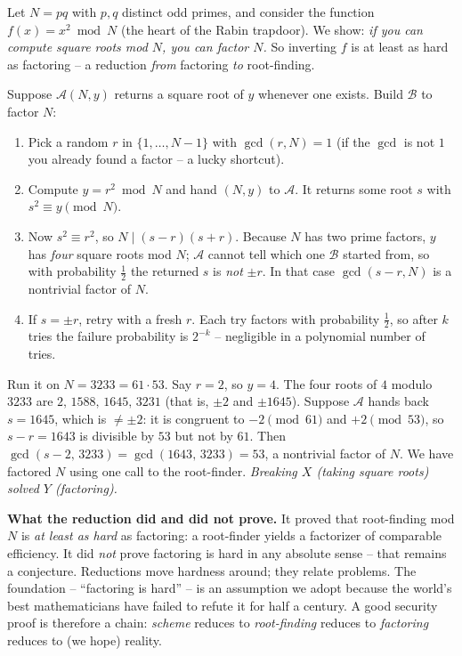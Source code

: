 \begin{example}
\label{ch08:ex-rabin}
Let $N=pq$ with $p,q$ distinct odd primes, and consider the function $f(x)=x^{2}\bmod N$ (the heart of the Rabin trapdoor). We show: \emph{if you can compute square roots mod $N$, you can factor $N$.} So inverting $f$ is at least as hard as factoring -- a reduction \emph{from} factoring \emph{to} root-finding.

Suppose $\mathcal A(N,y)$ returns a square root of $y$ whenever one exists. Build $\mathcal B$ to factor $N$:
\begin{enumerate}
\item Pick a random $r$ in $\{1,\dots,N-1\}$ with $\gcd(r,N)=1$ (if the $\gcd$ is not $1$ you already found a factor -- a lucky shortcut).
\item Compute $y = r^{2}\bmod N$ and hand $(N,y)$ to $\mathcal A$. It returns some root $s$ with $s^{2}\equiv y \pmod N$.
\item Now $s^{2}\equiv r^{2}$, so $N \mid (s-r)(s+r)$. Because $N$ has two prime factors, $y$ has \emph{four} square roots mod $N$; $\mathcal A$ cannot tell which one $\mathcal B$ started from, so with probability $\tfrac12$ the returned $s$ is \emph{not} $\pm r$. In that case $\gcd(s-r,N)$ is a nontrivial factor of $N$.
\item If $s=\pm r$, retry with a fresh $r$. Each try factors with probability $\tfrac12$, so after $k$ tries the failure probability is $2^{-k}$ -- negligible in a polynomial number of tries.
\end{enumerate}
Run it on $N=3233=61\cdot 53$. Say $r=2$, so $y = 4$. The four roots of $4$ modulo $3233$ are $2,\,1588,\,1645,\,3231$ (that is, $\pm 2$ and $\pm 1645$). Suppose $\mathcal A$ hands back $s = 1645$, which is $\ne \pm 2$: it is congruent to $-2\pmod{61}$ and $+2\pmod{53}$, so $s-r = 1643$ is divisible by $53$ but not by $61$. Then $\gcd(s-2,\,3233)=\gcd(1643,\,3233)=53$, a nontrivial factor of $N$. We have factored $N$ using one call to the root-finder. \emph{Breaking $X$ (taking square roots) solved $Y$ (factoring).}
\end{example}

\begin{whybox}
\textbf{What the reduction did and did not prove.} It proved that root-finding mod $N$ is \emph{at least as hard} as factoring: a root-finder yields a factorizer of comparable efficiency. It did \emph{not} prove factoring is hard in any absolute sense -- that remains a conjecture. Reductions move hardness around; they relate problems. The foundation -- ``factoring is hard'' -- is an assumption we adopt because the world's best mathematicians have failed to refute it for half a century. A good security proof is therefore a chain: \emph{scheme} reduces to \emph{root-finding} reduces to \emph{factoring} reduces to (we hope) reality.
\end{whybox}

